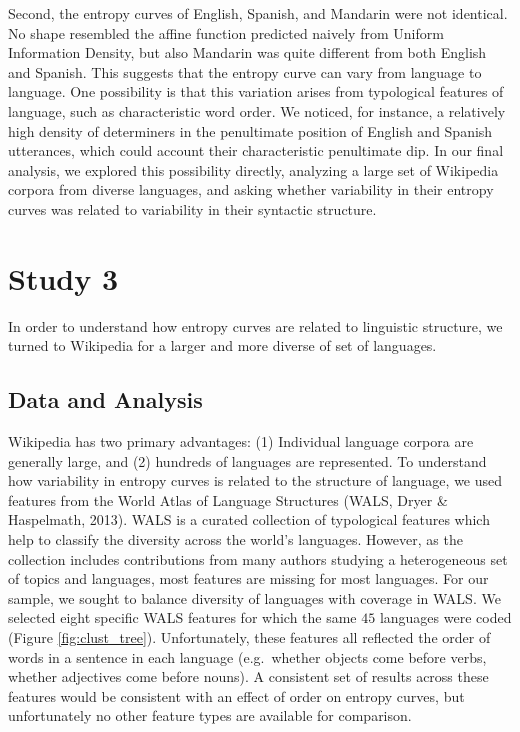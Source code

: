 \documentclass[10pt, letterpaper]{article}
\begin{document}
Second, the entropy curves of English, Spanish, and Mandarin were not
identical. No shape resembled the affine function predicted naively from
Uniform Information Density, but also Mandarin was quite different from
both English and Spanish. This suggests that the entropy curve can vary
from language to language. One possibility is that this variation arises
from typological features of language, such as characteristic word
order. We noticed, for instance, a relatively high density of
determiners in the penultimate position of English and Spanish
utterances, which could account their characteristic penultimate dip. In
our final analysis, we explored this possibility directly, analyzing a
large set of Wikipedia corpora from diverse languages, and asking
whether variability in their entropy curves was related to variability
in their syntactic structure.

\section{Study 3}\label{study-3}

In order to understand how entropy curves are related to linguistic
structure, we turned to Wikipedia for a larger and more diverse of set
of languages.

\subsection{Data and Analysis}\label{data-and-analysis-2}

Wikipedia has two primary advantages: (1) Individual language corpora
are generally large, and (2) hundreds of languages are represented. To
understand how variability in entropy curves is related to the structure
of language, we used features from the World Atlas of Language
Structures (WALS, Dryer \& Haspelmath, 2013). WALS is a curated
collection of typological features which help to classify the diversity
across the world's languages. However, as the collection includes
contributions from many authors studying a heterogeneous set of topics
and languages, most features are missing for most languages. For our
sample, we sought to balance diversity of languages with coverage in
WALS. We selected eight specific WALS features for which the same \(45\)
languages were coded (Figure \ref{fig:clust_tree}). Unfortunately, these
features all reflected the order of words in a sentence in each language
(e.g.~whether objects come before verbs, whether adjectives come before
nouns). A consistent set of results across these features would be
consistent with an effect of order on entropy curves, but unfortunately
no other feature types are available for comparison.
\end{document}
